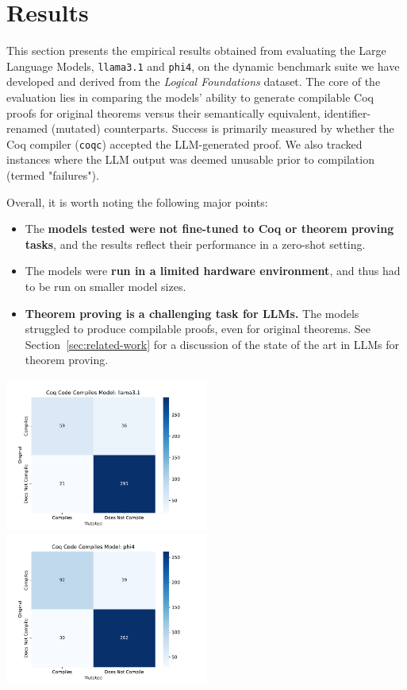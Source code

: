 \section{Results}
\label{sec:results}

This section presents the empirical results obtained from evaluating the Large Language Models, \texttt{llama3.1} and \texttt{phi4}, on the dynamic benchmark suite we have developed and derived from the \emph{Logical Foundations} dataset. 
The core of the evaluation lies in comparing the models' ability to generate compilable Coq proofs for original theorems versus their semantically equivalent, identifier-renamed (mutated) counterparts. 
Success is primarily measured by whether the Coq compiler (\texttt{coqc}) accepted the LLM-generated proof. 
We also tracked instances where the LLM output was deemed unusable prior to compilation (termed "failures").

\noindent Overall, it is worth noting the following major points:
\begin{itemize}
  \item The \textbf{models tested were not fine-tuned to Coq or theorem proving tasks}, and the results reflect their performance in a zero-shot setting.
  \item The models were \textbf{run in a limited hardware environment}, and thus had to be run on smaller model sizes.
  \item \textbf{Theorem proving is a challenging task for LLMs.} The models struggled to produce compilable proofs, even for original theorems. See Section~\ref{sec:related-work} for a discussion of the state of the art in LLMs for theorem proving.
\end{itemize}

\includegraphics[width=0.50\textwidth]{CM_Compiles_Model_llama3.1}
\includegraphics[width=0.50\textwidth]{CM_Compiles_Model_phi4}

